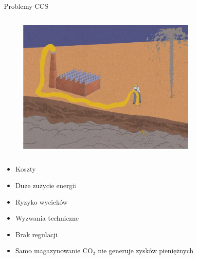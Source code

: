 \begin{columnframe}{Problemy CCS}
    \begin{column}{0.5\textwidth}
        \begin{figure}
            \centering
            \includegraphics[width=0.8\textwidth, frame]{images/anti_ccs_propaganda.jpg}
        \end{figure}
    \end{column}
    \begin{column}{0.5\textwidth}
        \begin{itemize}
            \item Koszty
            \item Duże zużycie energii
            \item Ryzyko wycieków
            \item Wyzwania techniczne
            \item Brak regulacji
            \item Samo magazynowanie CO$_2$ nie generuje zysków pieniężnych
        \end{itemize}
    \end{column}
\end{columnframe}
